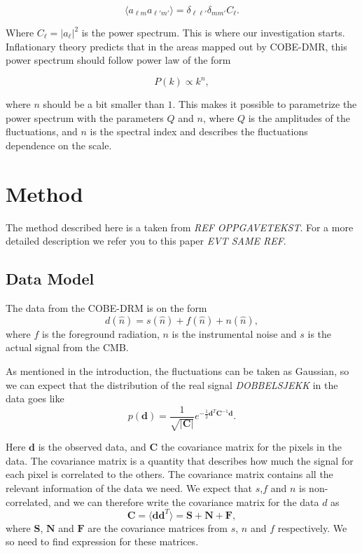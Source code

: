 \documentclass{emulateapj}
\begin{document}
\begin{equation}
\langle a_{\ell m}a_{\ell'm'}\rangle = \delta_{\ell \ell '}\delta_{m m'}C_\ell.
\end{equation}

Where $C_\ell = |a_\ell|^2$ is the power spectrum. This is where our investigation starts. Inflationary theory predicts that in the areas mapped out by COBE-DMR, this power spectrum should follow power law of the form

\begin{equation}
P(k) \propto k^n,
\end{equation}

where $n$ should be a bit smaller than $1$. This makes it possible to parametrize the power spectrum with the parameters $Q$ and $n$, where $Q$ is the amplitudes of the fluctuations, and $n$ is the spectral index and describes the fluctuations dependence on the scale.




\section{Method}
The method described here is a taken from \emph{REF OPPGAVETEKST}. For a more detailed description we refer you to this paper \emph{EVT SAME REF}.
\label{sec:method}

\subsection{Data Model}
The data from the COBE-DRM is on the form
\begin{equation}
d(\hat{n}) = s(\hat{n}) + f(\hat{n}) + n(\hat{n}),
\end{equation}
where $f$ is the foreground radiation, $n$ is the instrumental noise and $s$ is the actual signal from the CMB.

As mentioned in the introduction, the fluctuations can be taken as Gaussian, so we can expect that the distribution of the real signal \emph{DOBBELSJEKK} in the data goes like
\begin{equation}
p(\mathbf{d}) = \frac{1}{\sqrt{|\mathbf{C}|}}e^{-\frac{1}{2}\mathbf{d}^T \mathbf{C}^{-1}\mathbf{d}}.
 \end{equation} 

Here $\mathbf{d}$ is the observed data, and $\mathbf{C}$ the covariance matrix for the pixels in the data. The covariance matrix is a quantity that describes how much the signal for each pixel is correlated to the others. The covariance matrix contains all the relevant information of the data we need. We expect that $s$,$f$ and $n$ is non-correlated, and we can therefore write the covariance matrix for the data $d$ as 
\begin{equation}
\mathbf{C} = \langle \mathbf{d}\mathbf{d}^T\rangle = \mathbf{S} + \mathbf{N} + \mathbf{F},
\end{equation}
where $\mathbf{S}$, $\mathbf{N}$ and $\mathbf{F}$ are the covariance matrices from $s$, $n$ and $f$ respectively. We so need to find expression for these matrices. 
\end{document}
